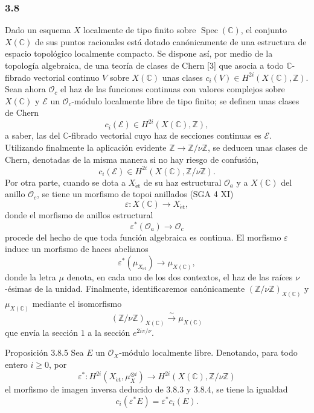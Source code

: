 \subsubsection*{3.8}
Dado un esquema $X$ localmente de tipo finito sobre $\operatorname{Spec}(\mathbb C)$, el conjunto $X(\mathbb C)$ de sus puntos racionales está dotado canónicamente de una estructura de espacio topológico localmente compacto. Se dispone así, por medio de la topología algebraica, de una teoría de clases de Chern [3] que asocia a todo $\mathbb C$-fibrado vectorial continuo $V$ sobre $X(\mathbb C)$ unas clases $c_i(V)\in H^{2i}(X(\mathbb C),\mathbb Z)$. Sean ahora $\mathcal O_c$ el haz de las funciones continuas con valores complejos sobre $X(\mathbb C)$ y $\mathcal E$ un $\mathcal O_c$-módulo localmente libre de tipo finito; se definen unas clases de Chern
\[
c_i(\mathcal E)\in H^{2i}(X(\mathbb C),\mathbb Z),
\]
a saber, las del $\mathbb C$-fibrado vectorial cuyo haz de secciones continuas es $\mathcal E$. Utilizando finalmente la aplicación evidente $\mathbb Z\to\mathbb Z/\nu\mathbb Z$, se deducen unas clases de Chern, denotadas de la misma manera si no hay riesgo de confusión,
\[
c_i(\mathcal E)\in H^{2i}(X(\mathbb C),\mathbb Z/\nu\mathbb Z).
\tag{3.8.1}
\]
Por otra parte, cuando se dota a $X_{\mathrm{\acute et}}$ de su haz estructural $\mathcal O_a$ y a $X(\mathbb C)$ del anillo $\mathcal O_c$, se tiene un morfismo de topoi anillados (SGA 4 XI)
\[
\varepsilon:X(\mathbb C)\to X_{\mathrm{\acute et}},
\]
donde el morfismo de anillos estructural
\[
\varepsilon^*(\mathcal O_a)\to\mathcal O_c
\tag{3.8.2}
\]
procede del hecho de que toda función algebraica es continua. El morfismo $\varepsilon$ induce un morfismo de haces abelianos
\[
\varepsilon^*(\mu_{X_{\mathrm{\acute et}}})\to \mu_{X(\mathbb C)},
\tag{3.8.3}
\]
donde la letra $\mu$ denota, en cada uno de los dos contextos, el haz de las raíces $\nu$-ésimas de la unidad. Finalmente, identificaremos canónicamente $(\mathbb Z/\nu\mathbb Z)_{X(\mathbb C)}$ y $\mu_{X(\mathbb C)}$ mediante el isomorfismo
\[
(\mathbb Z/\nu\mathbb Z)_{X(\mathbb C)}
 \xrightarrow{\sim}\mu_{X(\mathbb C)}
\tag{3.8.4}
\]
que envía la sección $1$ a la sección $e^{2i\pi/\nu}$.

\begin{statement}{Proposición 3.8.5}
Sea $E$ un $\mathcal O_X$-módulo localmente libre. Denotando, para todo entero $i\ge0$, por
\[
\varepsilon^*:H^{2i}(X_{\mathrm{\acute et}},\mu_X^{\otimes i})
\to H^{2i}(X(\mathbb C),\mathbb Z/\nu\mathbb Z)
\]
el morfismo de imagen inversa deducido de 3.8.3 y 3.8.4, se tiene la igualdad
\[
c_i(\varepsilon^*E)=\varepsilon^*c_i(E).
\]
\end{statement}
